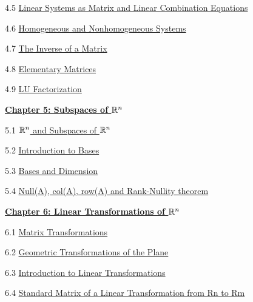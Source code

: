 \documentclass{ximera}
\begin{document}
4.5	\href{https://ximera.osu.edu/linearalgebradzv3/LinearAlgebraInteractiveIntro/MAT-0030/main}{Linear Systems as Matrix and Linear Combination Equations}
	
4.6	\href{https://ximera.osu.edu/linearalgebradzv3/LinearAlgebraInteractiveIntro/SYS-0050/main}{Homogeneous and Nonhomogeneous Systems}

4.7	\href{https://ximera.osu.edu/linearalgebradzv3/LinearAlgebraInteractiveIntro/MAT-0050/main}{The Inverse of a Matrix}
	
4.8	\href{https://ximera.osu.edu/linearalgebradzv3/LinearAlgebraInteractiveIntro/MAT-0060/main}{Elementary Matrices}
	
4.9	\href{https://ximera.osu.edu/linearalgebradzv3/LinearAlgebraInteractiveIntro/MAT-0070/main}{LU Factorization}
	
\href{https://ximera.osu.edu/linearalgebradzv3/LinearAlgebraInteractiveIntro/XLAChapter_subspacesRn/main}{\textbf{Chapter 5: Subspaces of $\mathbb{R}^n$}}
	
5.1	\href{https://ximera.osu.edu/linearalgebradzv3/LinearAlgebraInteractiveIntro/VSP-0020/main}{$\mathbb{R}^n$ and Subspaces of $\mathbb{R}^n$}
	
5.2	\href{https://ximera.osu.edu/linearalgebradzv3/LinearAlgebraInteractiveIntro/VSP-0030/main}{Introduction to Bases}
	
5.3	\href{https://ximera.osu.edu/linearalgebradzv3/LinearAlgebraInteractiveIntro/VSP-0035/main}{Bases and Dimension}
	
5.4	\href{https://ximera.osu.edu/linearalgebradzv3/LinearAlgebraInteractiveIntro/VSP-0040/main}{Null(A), col(A), row(A) and Rank-Nullity theorem}
	
\href{https://ximera.osu.edu/linearalgebradzv3/LinearAlgebraInteractiveIntro/XLAChapter_linTrans/main}{\textbf{Chapter 6: Linear Transformations of $\mathbb{R}^n$}}
	
6.1	\href{https://ximera.osu.edu/linearalgebradzv3/LinearAlgebraInteractiveIntro/LTR-0005/main}{Matrix Transformations}
	
6.2	\href{https://ximera.osu.edu/linearalgebradzv3/LinearAlgebraInteractiveIntro/LTR-0070/main}{Geometric Transformations of the Plane}
	
6.3	\href{https://ximera.osu.edu/linearalgebradzv3/LinearAlgebraInteractiveIntro/LTR-0010/main}{Introduction to Linear Transformations}
	
6.4	\href{https://ximera.osu.edu/linearalgebradzv3/LinearAlgebraInteractiveIntro/LTR-0020/main}{Standard Matrix of a Linear Transformation from Rn to Rm}
	
\end{document}
